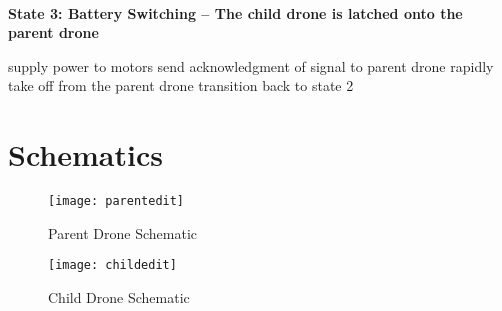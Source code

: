 \documentclass[paper=a4, fontsize=10pt]{scrartcl}
\begin{document}
\hfill\\%
\textbf{State 3: Battery Switching -- The child drone is latched onto the parent drone}\\%
\begin{algorithm}[H]
	supply power to motors\;
	send acknowledgment of signal to parent drone\;
	rapidly take off from the parent drone\;
	transition back to state 2\;
\end{algorithm}	

\newpage
\section{Schematics}
\begin{figure}[h!]
	\centering
	\texttt{[image: parentedit]}
	\caption{Parent Drone Schematic}
\end{figure}
\newpage
\begin{figure}[h!]
	\centering
	\texttt{[image: childedit]}
	\caption{Child Drone Schematic}
\end{figure}




\end{document}
